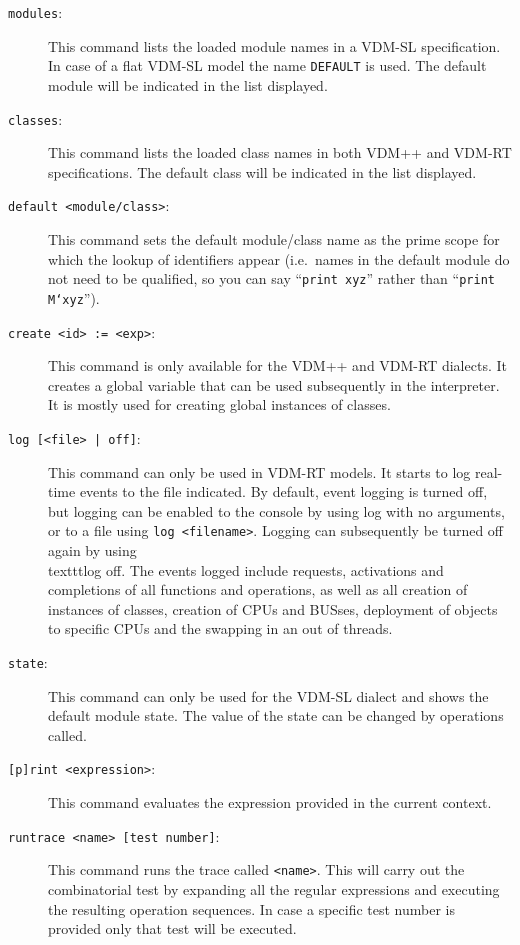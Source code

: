 \documentclass{overturerepchap}
\begin{document}
\begin{description}
\item[\texttt{modules}:] This command lists the loaded module names in
  a VDM-SL specification. In case of a flat VDM-SL model the name
  \texttt{DEFAULT} is used. The default module will be indicated in
  the list displayed.
\item[\texttt{classes}:] This command lists the loaded class names in
  both VDM++ and VDM-RT specifications. The default class will be indicated in
  the list displayed.
\item[\texttt{default <module/class>}:] This command sets the default
  module/class name as the prime scope for which the lookup of
  identifiers appear (i.e.\ names in the default module
do not need to be qualified, so you can say ``\texttt{print xyz}'' rather than
``\texttt{print M`xyz}'').
\item[\texttt{create <id> := <exp>}:] This command is only available
  for the VDM++ and VDM-RT dialects. It creates a global variable that
  can be used subsequently in the interpreter. It is mostly used for
  creating global instances of classes. 
\item[\texttt{log [<file> | off]}:] This command can only be used in
  VDM-RT models. It starts to log real-time events to the file indicated. By
  default, event logging is turned off, but logging can be enabled to
  the console by using log with no arguments, or to a file using \texttt{log
  <filename>}. Logging can subsequently be turned off again by using
  \\texttt{log off}. The events logged include requests, activations and
  completions of all functions and operations, as well as all creation
  of instances of classes, creation of CPUs and BUSses, deployment of objects
  to specific CPUs and the swapping in an out of threads.  
\item[\texttt{state}:] This command can only be used for the VDM-SL
  dialect and shows the default module state.  
  The value of the state can be changed by operations called.
\item[\texttt{[p]rint <expression>}:] This command evaluates the
  expression provided in the current
  context.     
\item[\texttt{runtrace <name> [test number]}:] This command runs the trace called
  \texttt{<name>}. This will carry out the combinatorial
  test by expanding all the regular expressions and executing the resulting
  operation sequences. In case a specific test number is provided only
  that test will be executed. 


\end{description}
\end{document}
